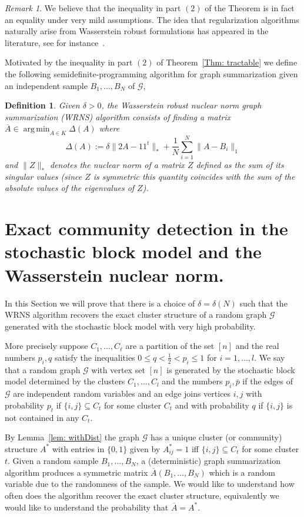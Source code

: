 \documentclass[12pt]{amsart}
\newtheorem{definition}[lemma]{Definition}
\theoremstyle{remark}
\newtheorem{remark}[lemma]{Remark}
\DeclareMathOperator*{\argmin}{arg\,min}
\newcommand{\grG}{{\mathcal{G}}}
\begin{document}
\begin{remark} We believe that the inequality in part $(2)$ of the Theorem is in fact an equality under very mild assumptions. The idea that regularization algorithms naturally arise from Wasserstein robust formulations has appeared in the literature, see for instance~\cite{ColumbiaAlvaro}.
\end{remark}

Motivated by the inequality in part $(2)$ of Theorem~\ref{Thm: tractable} we define the following semidefinite-programming algorithm for graph summarization given an independent sample $B_1,\dots, B_N$ of $\grG$,

\begin{definition}
Given $\delta>0$, the {\it Wasserstein robust nuclear norm graph summarization} (WRNS) algorithm consists of finding a matrix $\overline{A}\in \argmin_{A\in K} \Delta(A)$ where 
\[\Delta(A):= \delta\|2A-11^t\|_{*}+\frac{1}{N}\sum_{i=1}^N\|A-B_i\|_1\] 
and $\|Z\|_*$ denotes the nuclear norm of a matrix $Z$ defined as the sum of its singular values (since $Z$ is symmetric this quantity coincides with the sum of the absolute values of the eigenvalues of $Z$). 
\end{definition}



\section{Exact community detection in the stochastic block model and the Wasserstein nuclear norm.}
\label{Clustering}

In this Section we will prove that there is a choice of $\delta=\delta(N)$ such that the WRNS algorithm recovers the exact cluster structure of a random graph $\grG$ generated with the stochastic block model with very high probability. 

More precisely suppose $C_1,\dots, C_\ell$ are a partition of the set $[n]$ and the real numbers $p_i,q$ satisfy the inequalities $0\leq q<\frac{1}{2}<p_i\leq 1$ for $i=1,\dots, l$. We say that a random graph $\grG$ with vertex set $[n]$ is generated by the stochastic block model determined by the clusters $C_1,\dots,C_l$ and the numbers $p_i,\bar{p}$ if the edges of $\grG$ are independent random variables and an edge joins vertices $i,j$ with probability $p_t$ if $\{i,j\}\subseteq C_t$ for some cluster $C_t$ and with probability $q$ if $\{i,j\}$ is not contained in any $C_t$. 

By Lemma~\ref{lem: withDist} the graph $\grG$ has a unique cluster (or community) structure $A^*$ with entries in $\{0,1\}$ given by $A^*_{ij}=1$ iff $\{i,j\}\subseteq C_t$ for some cluster $t$. Given a random sample $B_1,\dots, B_N$, a (deterministic) graph summarization algorithm produces a symmetric matrix $\overline{A}(B_1,\dots, B_N)$ which is a random variable due to the randomness of the sample. We would like to understand how often does the algorithm recover the exact cluster structure, equivalently we would like to understand the probability that $\overline{A}=A^*$. 
\end{document}
